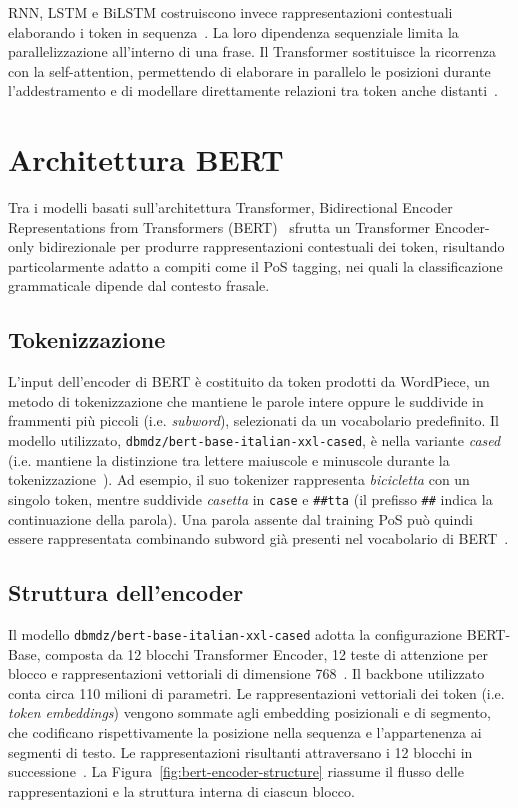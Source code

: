 \documentclass[12pt,a4paper]{report}
\begin{document}
RNN, LSTM e BiLSTM costruiscono invece rappresentazioni contestuali elaborando i token in sequenza~\cite{goldberg2016,plank2016}. La loro dipendenza sequenziale limita la parallelizzazione all'interno di una frase. Il Transformer sostituisce la ricorrenza con la self-attention, permettendo di elaborare in parallelo le posizioni durante l'addestramento e di modellare direttamente relazioni tra token anche distanti~\cite{vaswani2017}.

\section{Architettura BERT}
\label{sec:bert-architecture}

Tra i modelli basati sull'architettura Transformer, Bidirectional Encoder Representations from Transformers (BERT)~\cite{devlin2019} sfrutta un Transformer Encoder-only bidirezionale per produrre rappresentazioni contestuali dei token, risultando particolarmente adatto a compiti come il PoS tagging, nei quali la classificazione grammaticale dipende dal contesto frasale.

\subsection{Tokenizzazione}
\label{subsec:tokenization}

L'input dell'encoder di BERT è costituito da token prodotti da WordPiece, un metodo di tokenizzazione che mantiene le parole intere oppure le suddivide in frammenti più piccoli (i.e. \textit{subword}), selezionati da un vocabolario predefinito. Il modello utilizzato, \texttt{dbmdz/bert-base-italian-xxl-cased}, è nella variante \emph{cased} (i.e.  mantiene la distinzione tra lettere maiuscole e minuscole durante la tokenizzazione~\cite{bertxxl}). Ad esempio, il suo tokenizer rappresenta \emph{bicicletta} con un singolo token, mentre suddivide \emph{casetta} in \texttt{case} e \texttt{\#\#tta} (il prefisso \texttt{\#\#} indica la continuazione della parola). Una parola assente dal training PoS può quindi essere rappresentata combinando subword già presenti nel vocabolario di BERT~\cite{devlin2019}.

\subsection{Struttura dell'encoder}
\label{subsec:encoder-structure}

Il modello \texttt{dbmdz/bert-base-italian-xxl-cased} adotta la configurazione BERT-Base, composta da 12 blocchi Transformer Encoder, 12 teste di attenzione per blocco e rappresentazioni vettoriali di dimensione 768~\cite{bertxxl}. Il backbone utilizzato conta circa 110 milioni di parametri. Le rappresentazioni vettoriali dei token (i.e. \textit{token embeddings}) vengono sommate agli embedding posizionali e di segmento, che codificano rispettivamente la posizione nella sequenza e l'appartenenza ai segmenti di testo. Le rappresentazioni risultanti attraversano i 12 blocchi in successione~\cite{devlin2019}. La Figura~\ref{fig:bert-encoder-structure} riassume il flusso delle rappresentazioni e la struttura interna di ciascun blocco.
\end{document}
